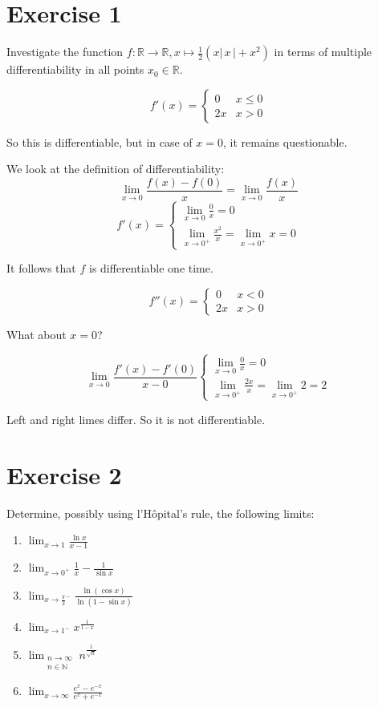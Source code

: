\documentclass[a4paper]{article}
\theoremstyle{definition}
\newcommand\abs[1]{\left|\,#1\,\right|}
\begin{document}
\clearpage
\section{Exercise 1}
\begin{ex}
  Investigate the function $f: \mathbb R \to \mathbb R, x \mapsto \frac12 (x \abs{x} + x^2)$
  in terms of multiple differentiability in all points $x_0 \in \mathbb R$.
\end{ex}

\[ f'(x) = \begin{cases} 0 & x \leq 0 \\ 2x & x > 0 \end{cases} \]

So this is differentiable, but in case of $x=0$, it remains questionable.

We look at the definition of differentiability:
\[
  \lim_{x \to 0} \frac{f(x) - f(0)}{x}
  = \lim_{x\to 0} \frac{f(x)}{x}
\] \[
  f'(x) = \begin{cases}
    \lim_{x\to 0} \frac{0}{x} = 0 \\
    \lim_{x\to 0^+} \frac{x^2}{x} = \lim_{x\to 0^+} x = 0
  \end{cases}
\]

It follows that $f$ is differentiable one time.

\[
  f''(x) = \begin{cases}
    0 & x < 0 \\
    2x & x > 0
  \end{cases}
\]

What about $x=0$?

\[
  \lim_{x\to 0} \frac{f'(x) - f'(0)}{x - 0}
  \begin{cases}
    \lim_{x\to 0} \frac0x = 0 \\
    \lim_{x\to 0^+} \frac{2x}{x} = \lim_{x\to0^+} 2 = 2
  \end{cases}
\]

Left and right limes differ. So it is not differentiable.

\section{Exercise 2}
\begin{ex}
  Determine, possibly using l'H\^{o}pital's rule, the following limits:
  \begin{enumerate}
    \item $\lim_{x\to1} \frac{\ln{x}}{x - 1}$
    \item $\lim_{x\to0^+} \frac{1}{x} - \frac{1}{\sin{x}}$
    \item $\lim_{x\to\frac\pi2^-} \frac{\ln(\cos{x})}{\ln(1 - \sin{x})}$
    \item $\lim_{x\to1^-} x^\frac{1}{1-x}$
    \item $\lim_{\substack{n\to\infty \\ n \in \mathbb N}} n^{\frac{1}{\sqrt{n}}}$
    \item $\lim_{x\to\infty} \frac{e^x - e^{-x}}{e^x + e^{-x}}$
  \end{enumerate}
\end{ex}
\end{document}

